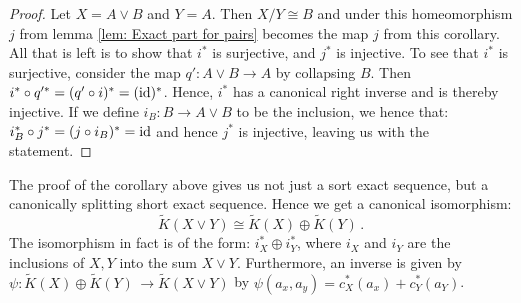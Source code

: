 \begin{proof}
	Let $X=A\vee B$ and $Y=A$. Then $X\slash Y \cong B$ and under this homeomorphism $j$ from lemma \ref{lem: Exact part for pairs} becomes the map $j$ from this corollary. All that is left is to show that $i^*$ is surjective, and $j^*$ is injective. 
	To see that $i^*$ is surjective, consider the map $q':A\vee B\to A$ by collapsing $B$. Then $i^*\circ q'^*=(q'\circ i)^*=(\operatorname{\text{id}})^*$. Hence, $i^*$ has a canonical right inverse and is thereby injective.  If we define $i_B:B\to A\vee B$ to be the inclusion, we hence that: $i_B^*\circ j^*=(j\circ i_B)^*=\operatorname{\text{id}}$ and hence $j^*$ is injective, leaving us with the statement.
\end{proof}
\begin{theorem}[Additivity]
	The proof of the corollary above gives us not just a sort exact sequence, but a canonically splitting short exact sequence. Hence we get a canonical isomorphism:
	\begin{equation*}
		\tilde{K}(X\vee Y)\cong \tilde{K}(X)\oplus \tilde{K}(Y)\, .
	\end{equation*}
	The isomorphism in fact is of the form: $i_X^*\oplus i_Y^*$, where $i_X$ and $i_Y$ are the inclusions of $X,Y$ into the sum $X\vee Y$. Furthermore, an inverse is given by $\psi: \tilde{K}(X)\oplus \tilde{K}(Y)\,  \to \tilde{K}(X\vee Y)$ by $\psi(a_x,a_y)=c_X^*(a_x)+c_Y^*(a_Y)$.
\end{theorem}
